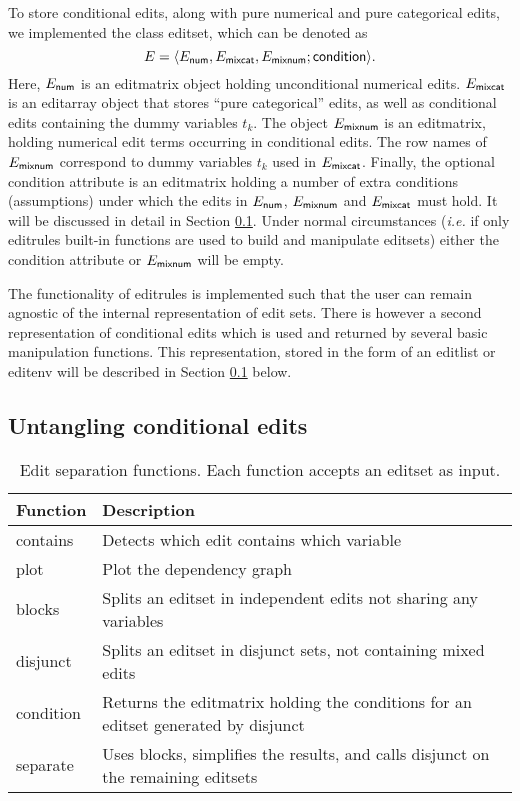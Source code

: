 \documentclass[11pt,fleqn,a4paper]{article}
\begin{document}
To store conditional edits, along with pure numerical and pure categorical
edits, we implemented the class {\sf editset}, which can be denoted as
\begin{equation}
\label{eqeditset}
E = \langle E_{\sf num}, E_{\sf mixcat}, E_{\sf mixnum};{\sf condition}\rangle.
\end{equation}
Here, $E_{\sf num}$ is an {\sf editmatrix} object holding unconditional numerical edits. 
$E_{\sf mixcat}$ is an {\sf editarray} object that stores ``pure categorical'' edits, as well as 
conditional edits containing the dummy variables $t_k$. 
The object $E_{\sf mixnum}$ is an {\sf editmatrix}, holding numerical edit terms occurring 
in conditional edits. The row names of $E_{\sf mixnum}$ correspond to dummy variables $t_k$ 
used in $E_{\sf mixcat}$. Finally, the
optional {\sf condition} attribute is an {\sf editmatrix} holding a
number of extra conditions (assumptions) under which the edits in $E_{\sf
num}$, $E_{\sf mixnum}$ and $E_{\sf mixcat}$ must hold. It will be discussed in
detail in Section \ref{ss:editlist}. Under normal circumstances ({\em i.e.} if only
editrules built-in functions are used to build and manipulate {\sf editsets})
either the {\sf condition} attribute or $E_{\sf mixnum}$ will be empty.

The functionality of {\sf editrules} is implemented such that the user can
remain agnostic of the internal representation of edit sets. There is however a
second representation of conditional edits which is used and returned by
several basic manipulation functions. This representation, stored in the form
of an {\sf editlist} or {\sf editenv} will be described in Section
\ref{ss:editlist} below.



\subsection{Untangling conditional edits}
\label{ss:editlist}
%
%
\begin{table}[t]
\caption{Edit separation functions. Each function accepts an {\sf editset} as input.}
\label{tab:separators}
\begin{tabular}{lp{}}
\hline
Function & Description\\
\hline
{\sf contains}  & Detects which edit contains which variable\\
{\sf plot}      & Plot the dependency graph\\
{\sf blocks}   & Splits an {\sf editset} in independent edits not sharing any variables\\
{\sf disjunct} & Splits an {\sf editset} in disjunct sets, not containing mixed edits\\
{\sf condition} & Returns the {\sf editmatrix} holding the conditions for an {\sf editset} generated by {\sf disjunct}\\
{\sf separate} & Uses {\sf blocks}, simplifies the results, and calls {\sf disjunct} on the remaining {\sf editset}s\\
\hline
\end{tabular}
\end{table}
\end{document}
